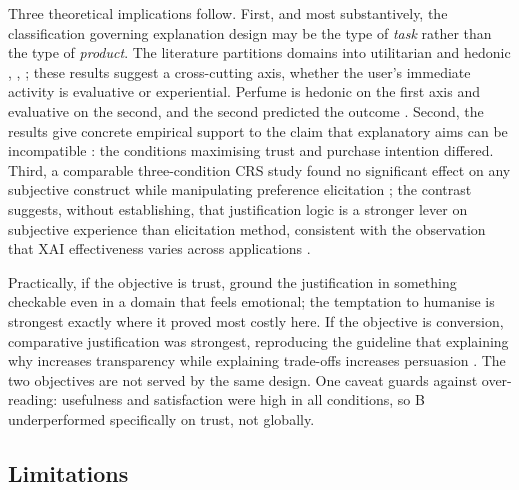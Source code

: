\documentclass[conference]{IEEEtran}
\begin{document}
Three theoretical implications follow. First, and most substantively, the classification
governing explanation design may be the type of \textit{task} rather than the type of
\textit{product}. The literature partitions domains into utilitarian and hedonic
\cite{chen2024}, \cite{wangx2022}, \cite{varga2024}; these results suggest a cross-cutting
axis, whether the user's immediate activity is evaluative or experiential. Perfume is
hedonic on the first axis and evaluative on the second, and the second predicted the
outcome \cite{libaoku2024}. Second, the results give concrete empirical support to the
claim that explanatory aims can be incompatible \cite{tintarev2012}: the conditions
maximising trust and purchase intention differed. Third, a comparable three-condition CRS
study found no significant effect on any subjective construct while manipulating preference
elicitation \cite{ziegfeld2025}; the contrast suggests, without establishing, that
justification logic is a stronger lever on subjective experience than elicitation method,
consistent with the observation that XAI effectiveness varies across applications
\cite{rong2024}.

Practically, if the objective is trust, ground the justification in something checkable
even in a domain that feels emotional; the temptation to humanise is strongest exactly
where it proved most costly here. If the objective is conversion, comparative justification
was strongest, reproducing the guideline that explaining why increases transparency while
explaining trade-offs increases persuasion \cite{pu2012}. The two objectives are not served
by the same design. One caveat guards against over-reading: usefulness and satisfaction
were high in all conditions, so B underperformed specifically on trust, not globally.

\subsection{Limitations}
\end{document}

